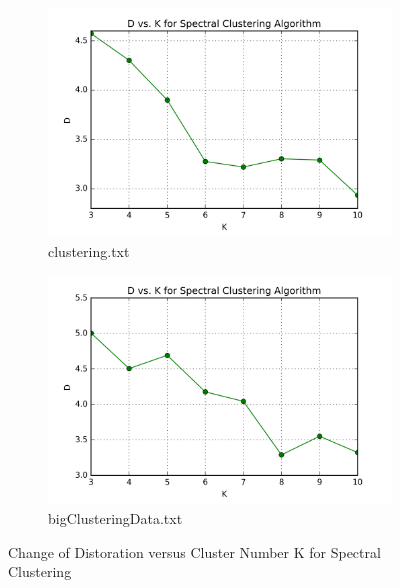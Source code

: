 \begin{description}
\begin{description}
\begin{figure}[H]
\centering
\centering
        \begin{subfigure}[b]{0.49\textwidth}
            \centering
            \includegraphics[width=\textwidth]{./figures/loss_clustering_spectral.png}
            \caption{clustering.txt}\label{fig:10a}
        \end{subfigure}
        \hfill
        \begin{subfigure}[b]{0.49\textwidth}  
            \centering 
            \includegraphics[width=\textwidth]{./figures/loss_bigClustering_spectral.png}
            \caption{bigClusteringData.txt}\label{fig:10b}
        \end{subfigure}
\caption{Change of Distoration versus Cluster Number K for Spectral Clustering}
\label{fig:spectral-loss} 
\end{figure}



\end{description}
\end{description}
